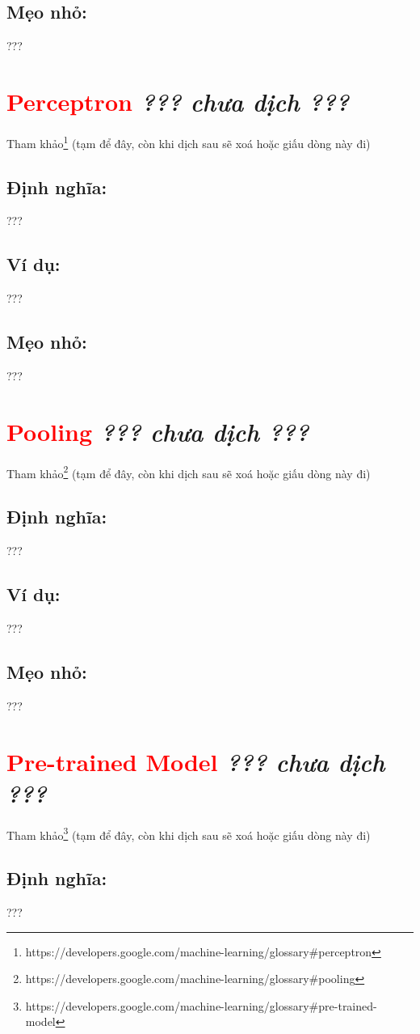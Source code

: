 \subsection*{Mẹo nhỏ:}
???
\section*{\huge \textcolor{Red}{Perceptron}  \small \textit{??? chưa dịch ???} }
Tham khảo\footnote{https://developers.google.com/machine-learning/glossary\#perceptron} (tạm để đây, còn khi dịch sau sẽ xoá hoặc giấu dòng này đi)
\subsection*{Định nghĩa:}
???
\subsection*{Ví dụ:}
???
\subsection*{Mẹo nhỏ:}
???
\section*{\huge \textcolor{Red}{Pooling}  \small \textit{??? chưa dịch ???} }
Tham khảo\footnote{https://developers.google.com/machine-learning/glossary\#pooling} (tạm để đây, còn khi dịch sau sẽ xoá hoặc giấu dòng này đi)
\subsection*{Định nghĩa:}
???
\subsection*{Ví dụ:}
???
\subsection*{Mẹo nhỏ:}
???
\section*{\huge \textcolor{Red}{Pre-trained Model}  \small \textit{??? chưa dịch ???} }
Tham khảo\footnote{ 	https://developers.google.com/machine-learning/glossary\#pre-trained-model} (tạm để đây, còn khi dịch sau sẽ xoá hoặc giấu dòng này đi)
\subsection*{Định nghĩa:}
???
